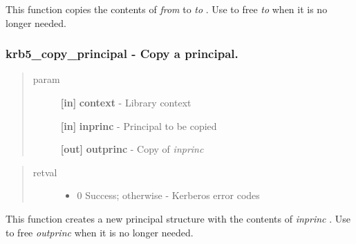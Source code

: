 \documentclass[letterpaper,10pt,english]{sphinxmanual}
\begin{document}
This function copies the contents of \emph{from} to \emph{to} . Use {\hyperref[appdev/refs/api/krb5_free_keyblock_contents:krb5_free_keyblock_contents]{}} to free \emph{to} when it is no longer needed.


\subsubsection{krb5\_copy\_principal -  Copy a principal.}
\label{appdev/refs/api/krb5_copy_principal:krb5-copy-principal-copy-a-principal}\label{appdev/refs/api/krb5_copy_principal::doc}

\begin{fulllineitems}
\label{appdev/refs/api/krb5_copy_principal:krb5_copy_principal}
\end{fulllineitems}

\begin{quote}\begin{description}
\item[{param}] \leavevmode
\textbf{{[}in{]}} \textbf{context} - Library context

\textbf{{[}in{]}} \textbf{inprinc} - Principal to be copied

\textbf{{[}out{]}} \textbf{outprinc} - Copy of \emph{inprinc}

\end{description}\end{quote}
\begin{quote}\begin{description}
\item[{retval}] \leavevmode\begin{itemize}
\item {} 
0   Success; otherwise - Kerberos error codes

\end{itemize}

\end{description}\end{quote}

This function creates a new principal structure with the contents of \emph{inprinc} . Use {\hyperref[appdev/refs/api/krb5_free_principal:krb5_free_principal]{}} to free \emph{outprinc} when it is no longer needed.
\end{document}
